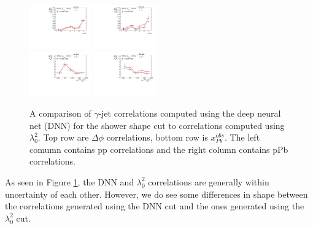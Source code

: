 \begin{figure}
    \centering
    \includegraphics[width=0.24\textwidth]{GammaJet/pp_pPb_correlations/hadj_dPhipp_data_Comparison.pdf}
    \includegraphics[width=0.24\textwidth]{GammaJet/pp_pPb_correlations/hadj_dPhipPb_data_Comparison.pdf} \\
    \includegraphics[width=0.24\textwidth]{GammaJet/pp_pPb_correlations/hadj_XobsPbpp_data_Comparison.pdf}
    \includegraphics[width=0.24\textwidth]{GammaJet/pp_pPb_correlations/hadj_XobsPbpPb_data_Comparison.pdf}
    \caption{A comparison of $\gamma$-jet correlations computed using the deep neural net (DNN) for the shower shape cut to correlations computed using $\lambda_0^2$. Top row are $\Delta \phi$ correlations, bottom row is $x^{obs}_{Pb}$. The left comumn contains pp correlations and the right column contains pPb correlations.}
    \label{fig:DNNlambda}
\end{figure}

As seen in Figure \ref{fig:DNNlambda}, the DNN and $\lambda_0^2$ correlations are generally within uncertainty of each other. However, we do see some differences in shape between the correlations generated using the DNN cut and the ones generated using the $\lambda_0^2$ cut.

\FloatBarrier
